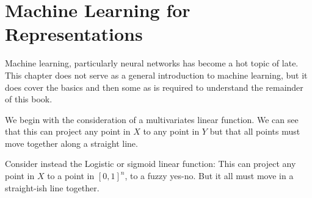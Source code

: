 \documentclass[12pt,parskip]{komatufte}
\begin{document}
	

\chapter{Machine Learning for Representations}\label{sec:machine-learning-for-representations}


Machine learning, particularly neural networks has become a hot topic of late.
This chapter does not serve as a general introduction to machine learning,
but it does cover the basics and then some as is required to understand the remainder of this book.


We begin with the consideration of a multivariates linear function.
We can see that this can project any point in $X$ to any point in $Y$ but that all points must move together along a straight line.

Consider instead the Logistic or sigmoid linear function:
This can project any point in $X$ to a point in $[0,1]^n$,
to a fuzzy yes-no.
But it all must move in a straight-ish line together.






\blindtext
\end{document}
